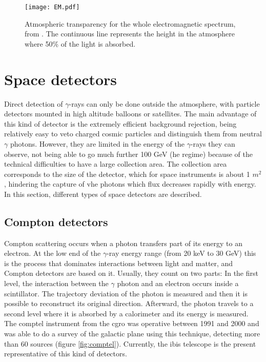 \documentclass[main.tex]{subfiles}
\begin{document}
\begin{figure}[h]
  \centering
  \texttt{[image: EM.pdf]}
  \caption{Atmospheric transparency for the whole electromagnetic spectrum, from \cite{highenergyastrophy}. The continuous line represents the height in the atmosphere where 50\% of the light is absorbed.}
  \label{fig:atmoabsorb}
\end{figure}

\section{Space detectors} \label{sec:spacedet}

Direct detection of $\gamma$-rays can only be done outside the atmosphere, with particle detectors mounted in high altitude balloons or satellites. The main advantage of this kind of detector is the extremely efficient background rejection, being relatively easy to veto charged cosmic particles and distinguish them from neutral $\gamma$ photons. However, they are limited in the energy of the $\gamma$-rays they can observe, not being able to go much further 100 GeV (\gls{he} regime) because of the technical difficulties to have a large collection area. The collection area corresponds to the size of the detector, which for space instruments is about 1 $m^2$, hindering the capture of \gls{vhe} photons which flux decreases rapidly with energy.\\
In this section, different types of space detectors are described.

\subsection{Compton detectors}\label{sec:comptondetectors}

Compton scattering occurs when a photon transfers part of its energy to an electron. At the low end of the $\gamma$-ray energy range (from 20 keV to 30 GeV) this is the process that dominates interactions between light and matter, and Compton detectors are based on it. Usually, they count on two parts: In the first level, the interaction between the $\gamma$ photon and an electron occurs inside a scintillator. The trajectory deviation of the photon is measured and then it is possible to reconstruct its original direction. Afterward, the photon travels to a second level where it is absorbed by a calorimeter and its energy is measured. The \gls{comptel} instrument from the \gls{cgro} was operative between 1991 and 2000 and was able to do a survey of the galactic plane using this technique, detecting more than 60 sources (figure \ref{fig:comptel}). Currently, the \gls{ibis} \cite{IBIS} telescope \cite{INTEGRAL} is the present representative of this kind of detectors.
\end{document}
